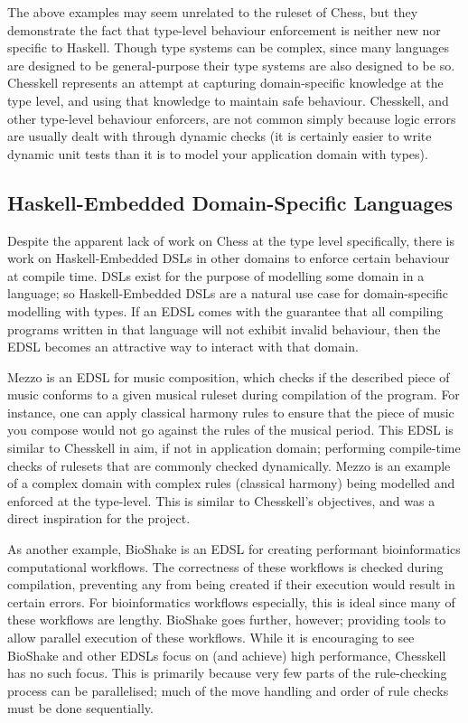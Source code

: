 \documentclass[12pt, a4paper, bibliography=totocnumbered]{scrreprt}
\begin{document}
The above examples may seem unrelated to the ruleset of Chess, but they demonstrate the fact that type-level behaviour enforcement is neither new nor specific to Haskell. Though type systems can be complex, since many languages are designed to be general-purpose their type systems are also designed to be so. Chesskell represents an attempt at capturing domain-specific knowledge at the type level, and using that knowledge to maintain safe behaviour. Chesskell, and other type-level behaviour enforcers, are not common simply because logic errors are usually dealt with through dynamic checks (it is certainly easier to write dynamic unit tests than it is to model your application domain with types).

\subsection{Haskell-Embedded Domain-Specific Languages}

Despite the apparent lack of work on Chess at the type level specifically, there is work on Haskell-Embedded DSLs in other domains to enforce certain behaviour at compile time. DSLs exist for the purpose of modelling some domain in a language; so Haskell-Embedded DSLs are a natural use case for domain-specific modelling with types. If an EDSL comes with the guarantee that all compiling programs written in that language will not exhibit invalid behaviour, then the EDSL becomes an attractive way to interact with that domain.

Mezzo \cite{mezzohaskellsymposium} is an EDSL for music composition, which checks if the described piece of music conforms to a given musical ruleset during compilation of the program. For instance, one can apply classical harmony rules to ensure that the piece of music you compose would not go against the rules of the musical period. This EDSL is similar to Chesskell in aim, if not in application domain; performing compile-time checks of rulesets that are commonly checked dynamically. Mezzo is an example of a complex domain with complex rules (classical harmony) being modelled and enforced at the type-level. This is similar to Chesskell's objectives, and was a direct inspiration for the project.

As another example, BioShake \cite{bioshake} is an EDSL for creating performant bioinformatics computational workflows. The correctness of these workflows is checked during compilation, preventing any from being created if their execution would result in certain errors. For bioinformatics workflows especially, this is ideal since many of these workflows are lengthy. BioShake goes further, however; providing tools to allow parallel execution of these workflows. While it is encouraging to see BioShake and other EDSLs \cite{aplite} focus on (and achieve) high performance, Chesskell has no such focus. This is primarily because very few parts of the rule-checking process can be parallelised; much of the move handling and order of rule checks must be done sequentially.
\end{document}
